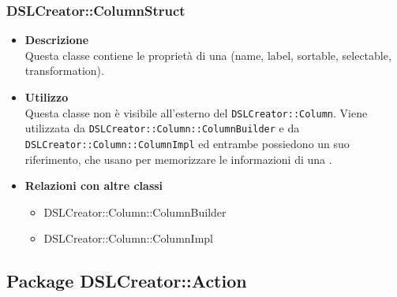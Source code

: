  \subsubsection{DSLCreator::ColumnStruct}
                    \begin{itemize}
                        \item \textbf{Descrizione} \hfill \\
                          Questa classe contiene le proprietà di una  (name, label, sortable, selectable, transformation).
                        \item \textbf{Utilizzo} \hfill \\
                          Questa classe non è visibile all'esterno del  \texttt{DSLCreator::Column}. Viene utilizzata da \texttt{DSLCreator::Column::ColumnBuilder} e da \texttt{DSLCreator::Column::ColumnImpl} ed entrambe possiedono un suo riferimento, che usano per memorizzare le informazioni di una .
                        \item \textbf{Relazioni con altre classi}
                            \begin{itemize}
                              \item DSLCreator::Column::ColumnBuilder
                              \item DSLCreator::Column::ColumnImpl
                            \end{itemize}
                    \end{itemize}  

\subsection{Package DSLCreator::Action}
